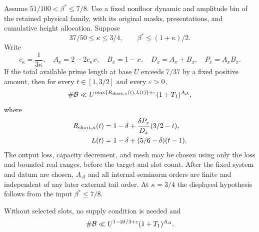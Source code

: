 \begin{theorem}\label{thm:count}
Assume $51/100<\beta^*\le7/8$. Use a fixed nonfloor dynamic and amplitude bin of the retained physical family, with its original masks, presentations, and cumulative height allocation. Suppose
\[
 37/50\le\kappa\le3/4,\qquad \beta^*\le(1+\kappa)/2.
\]
Write
\begin{equation}\label{eq:countparameters}
 c_\kappa=\frac1{3\kappa},\quad A_x=2-2c_\kappa x,\quad
 B_x=1-x,\quad D_x=A_x+B_x,\quad P_x=A_xB_x.
\end{equation}
If the total available prime length at base $U$ exceeds $7/37$ by a fixed positive amount, then for every $t\in[1,3/2]$ and every $\varepsilon>0$,
\begin{equation}\label{eq:rowcount}
 \#\mathcal B\ll U^{\max\{R_{{\rm short},\kappa}(t),L(t)\}+\varepsilon}(1+T_1)^{A_{\mathcal A}},
\end{equation}
where
\begin{align}
 R_{{\rm short},\kappa}(t)&=1-\delta+\frac{\delta P_x}{D_x}(3/2-t),\label{eq:shortcount}\\
 L(t)&=1-\delta+(5/6-\delta)(t-1).\label{eq:longcount}
\end{align}
The output loss, capacity decrement, and mesh may be chosen using only the loss and bounded real ranges, before the target and slot count. After the fixed system and datum are chosen, $A_{\mathcal A}$ and all internal seminorm orders are finite and independent of any later external tail order. At $\kappa=3/4$ the displayed hypothesis follows from the input $\beta^*\le7/8$.

Without selected slots, no supply condition is needed and
\begin{equation}\label{eq:noslotcount}
 \#\mathcal B\ll U^{1-2\delta/3+\varepsilon}(1+T_1)^{A_{\mathcal A}}.
\end{equation}
\end{theorem}
